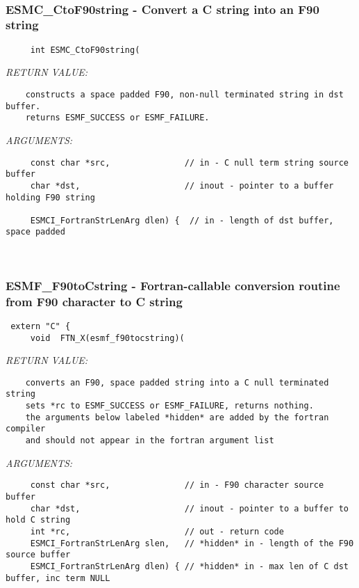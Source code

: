  
\mbox{}\hrulefill\
 
\subsubsection [ESMC\_CtoF90string] {ESMC\_CtoF90string - Convert a C string into an F90 string}


  
\begin{verbatim}     int ESMC_CtoF90string(\end{verbatim}{\em RETURN VALUE:}
\begin{verbatim}    constructs a space padded F90, non-null terminated string in dst buffer.
    returns ESMF_SUCCESS or ESMF_FAILURE.\end{verbatim}{\em ARGUMENTS:}
\begin{verbatim}     const char *src,               // in - C null term string source buffer
     char *dst,                     // inout - pointer to a buffer holding F90 string
 
     ESMCI_FortranStrLenArg dlen) {  // in - length of dst buffer, space padded\end{verbatim}
 
 
\mbox{}\hrulefill\
 
\subsubsection [ESMF\_F90toCstring] {ESMF\_F90toCstring - Fortran-callable conversion routine from F90 character to C string}


  
\begin{verbatim} extern "C" {
     void  FTN_X(esmf_f90tocstring)(\end{verbatim}{\em RETURN VALUE:}
\begin{verbatim}    converts an F90, space padded string into a C null terminated string
    sets *rc to ESMF_SUCCESS or ESMF_FAILURE, returns nothing.
    the arguments below labeled *hidden* are added by the fortran compiler
    and should not appear in the fortran argument list\end{verbatim}{\em ARGUMENTS:}
\begin{verbatim}     const char *src,               // in - F90 character source buffer
     char *dst,                     // inout - pointer to a buffer to hold C string
     int *rc,                       // out - return code
     ESMCI_FortranStrLenArg slen,   // *hidden* in - length of the F90 source buffer
     ESMCI_FortranStrLenArg dlen) { // *hidden* in - max len of C dst buffer, inc term NULL\end{verbatim}
 
